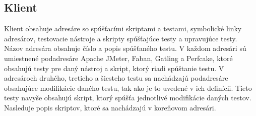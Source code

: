 \documentclass[12pt,oneside,final]{fithesis-utf8}
\begin{document}
\subsection{Klient}
Klient obsahuje adresáre so spúšťacími skriptami a testami, symbolické linky adresárov, testovacie nástroje a skripty spúšťajúce testy a upravujúce testy. Názov adresára obsahuje číslo a popis spúšťaného testu. V každom adresári sú umiestnené podadresáre Apache JMeter, Faban, Gatling a Perfcake, ktoré obsahujú testy pre daný nástroj a skript, ktorý riadi spúštanie testu. V adresároch druhého, tretieho a šiesteho testu sa nachádzajú podadresáre obsahujúce modifikácie daného testu, tak ako je to uvedené v ich definícii. Tieto testy navyše obsahujú skript, ktorý spúšťa jednotlivé modifikácie daných testov. Nasleduje popis skriptov, ktoré sa nachádzajú v koreňovom adresári.	
\end{document}
